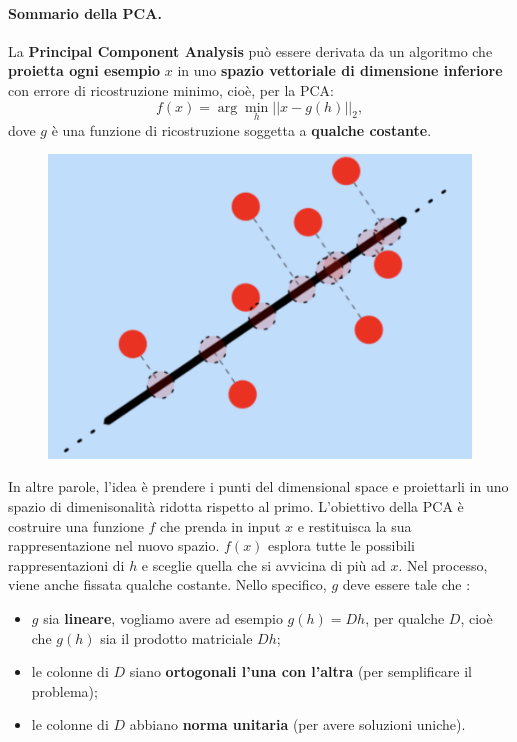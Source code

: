 \paragraph{Sommario della PCA.}
La \textbf{Principal Component Analysis} può essere derivata da un algoritmo che \textbf{proietta ogni esempio
} $x$ in uno \textbf{spazio vettoriale di dimensione inferiore} con errore di ricostruzione minimo, cioè,
per la PCA:
\begin{equation}
  f(x)=\arg \min_h{||x-g(h)||_2},
\end{equation}
dove $g$ è una funzione di ricostruzione soggetta a \textbf{qualche costante}.
\begin{figure}[!h]
  \centering
  \includegraphics[scale=.4]{images/autoencoders/pca.png}
\end{figure}


In altre parole, l'idea è prendere i punti del dimensional space e proiettarli in uno spazio di dimenisonalità 
ridotta rispetto al primo. L'obiettivo della PCA è costruire una funzione $f$ che prenda in input $x$ e 
restituisca la sua rappresentazione nel nuovo spazio. $f(x)$ esplora tutte le possibili rappresentazioni di 
$h$ e sceglie quella che si avvicina di più ad $x$. Nel processo, viene anche fissata qualche costante.
\newline
\newline
Nello specifico, $g$ deve essere tale che :
\begin{itemize}
  \item $g$ sia \textbf{lineare}, vogliamo avere ad esempio $g(h)=Dh$, per qualche $D$, cioè che $g(h)$ 
  sia il prodotto matriciale $Dh$;
  \item le colonne di $D$ siano \textbf{ortogonali l'una con l'altra} (per semplificare il problema);
  \item le colonne di $D$ abbiano \textbf{norma unitaria} (per avere soluzioni uniche).
\end{itemize}


